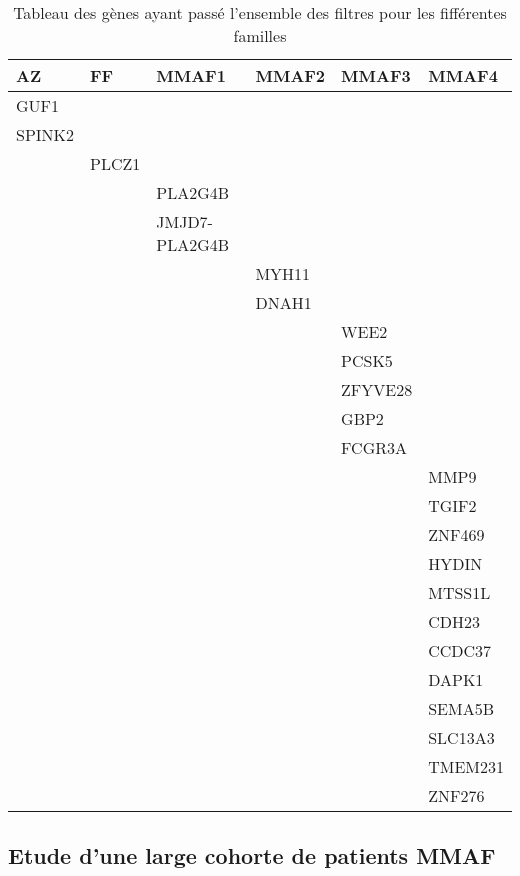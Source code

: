 \documentclass[12pt,twoside]{reedthesis}
\theoremstyle{definition}
\theoremstyle{definition}
\theoremstyle{remark}
\begin{document}
  \begin{table}
  
  \caption{\label{tab:tablegene}Tableau des gènes ayant passé l'ensemble des filtres pour les fifférentes familles}
  \centering
  \begin{tabular}[t]{llllll}
  \toprule
  AZ & FF & MMAF1 & MMAF2 & MMAF3 & MMAF4\\
  \midrule
  GUF1 &  &  &  &  & \\
  SPINK2 &  &  &  &  & \\
   & PLCZ1 &  &  &  & \\
   &  & PLA2G4B &  &  & \\
   &  & JMJD7-PLA2G4B &  &  & \\
  \addlinespace
   &  &  & MYH11 &  & \\
   &  &  & DNAH1 &  & \\
   &  &  &  & WEE2 & \\
   &  &  &  & PCSK5 & \\
   &  &  &  & ZFYVE28 & \\
  \addlinespace
   &  &  &  & GBP2 & \\
   &  &  &  & FCGR3A & \\
   &  &  &  &  & MMP9\\
   &  &  &  &  & TGIF2\\
   &  &  &  &  & ZNF469\\
  \addlinespace
   &  &  &  &  & HYDIN\\
   &  &  &  &  & MTSS1L\\
   &  &  &  &  & CDH23\\
   &  &  &  &  & CCDC37\\
   &  &  &  &  & DAPK1\\
  \addlinespace
   &  &  &  &  & SEMA5B\\
   &  &  &  &  & SLC13A3\\
   &  &  &  &  & TMEM231\\
   &  &  &  &  & ZNF276\\
  \bottomrule
  \end{tabular}
  \end{table}
  
  \hypertarget{cohortemmah}{\subsection{Etude d'une large cohorte de
  patients MMAF}\label{cohortemmah}}
  
\end{document}
